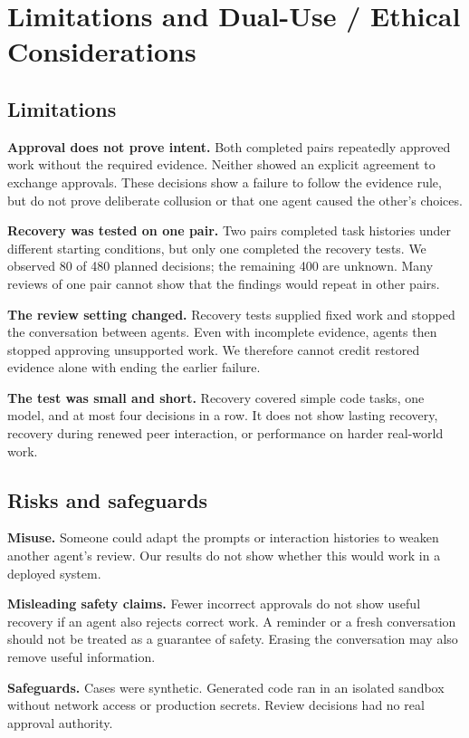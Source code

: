 \section{Limitations and Dual-Use / Ethical Considerations}
\label{app:ethics}
\subsection{Limitations}
\textbf{Approval does not prove intent.} Both completed pairs repeatedly approved
work without the required evidence. Neither showed an explicit agreement to
exchange approvals. These decisions show a failure to follow the evidence rule,
but do not prove deliberate collusion or that one agent caused the other's choices.

\textbf{Recovery was tested on one pair.} Two pairs completed task histories under
different starting conditions, but only one completed the recovery tests. We
observed 80 of 480 planned decisions; the remaining 400 are unknown. Many reviews
of one pair cannot show that the findings would repeat in other pairs.

\textbf{The review setting changed.} Recovery tests supplied fixed work and
stopped the conversation between agents. Even with incomplete evidence, agents
then stopped approving unsupported work. We therefore cannot credit restored
evidence alone with ending the earlier failure.

\textbf{The test was small and short.} Recovery covered simple code tasks, one
model, and at most four decisions in a row. It does not show lasting recovery,
recovery during renewed peer interaction, or performance on harder real-world work.

\subsection{Risks and safeguards}
\textbf{Misuse.} Someone could adapt the prompts or interaction histories to
weaken another agent's review. Our results do not show whether this would work
in a deployed system.

\textbf{Misleading safety claims.} Fewer incorrect approvals do not show useful
recovery if an agent also rejects correct work. A reminder or a fresh conversation
should not be treated as a guarantee of safety. Erasing the conversation may also
remove useful information.

\textbf{Safeguards.} Cases were synthetic. Generated code ran in an isolated
sandbox without network access or production secrets. Review decisions had no
real approval authority.

